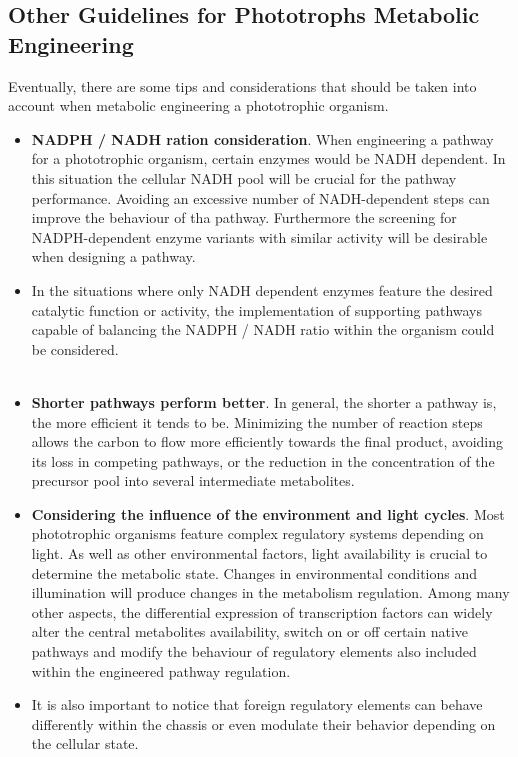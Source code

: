 \subsection{Other Guidelines for Phototrophs Metabolic Engineering}
Eventually, there are some tips and considerations that should be  taken into account when metabolic engineering a phototrophic organism.
\begin{itemize}
\item[] \textbf{NADPH / NADH ration consideration}. When engineering a pathway for a phototrophic organism, certain enzymes would be NADH dependent. In this situation the cellular NADH pool will be crucial for the pathway performance. Avoiding an excessive number of NADH-dependent steps can improve the behaviour of tha pathway. Furthermore the screening for NADPH-dependent enzyme variants with similar activity will be desirable when designing a pathway.
\item[]In the situations where only NADH dependent enzymes feature the desired catalytic function or activity, the implementation of supporting pathways capable of balancing the NADPH / NADH ratio within the organism could be considered. \\ \\
\item[] \textbf{Shorter pathways perform better}. In general, the shorter a pathway is, the more efficient it tends to be. Minimizing the number of reaction steps allows the carbon to flow more efficiently towards the final product, avoiding its loss in competing pathways, or the  reduction in the concentration of the precursor pool into several intermediate metabolites.
\item[] \textbf{Considering the influence of the environment and light cycles}. Most phototrophic organisms feature complex regulatory systems depending on light. As well as other environmental factors, light availability is crucial to determine the metabolic state. Changes in environmental conditions and illumination will produce changes in the metabolism regulation. Among many other aspects, the differential expression of transcription factors can widely alter the central metabolites availability, switch on or off certain native pathways and modify the behaviour of regulatory elements also included within the engineered pathway regulation.
\item[]It is also important to notice that foreign regulatory elements can behave differently within the chassis or even modulate their behavior depending on the cellular state.

\end{itemize}
